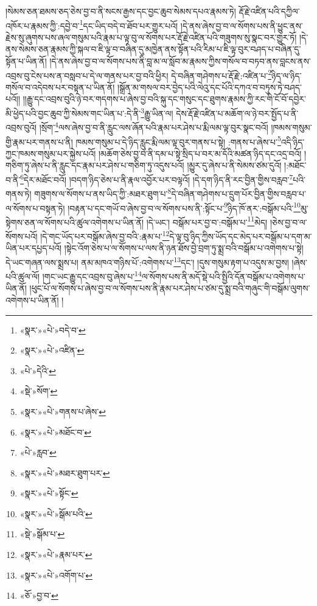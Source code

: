 །སེམས་ཅན་ཐམས་ཅད་ཅེས་བྱ་བ་ནི་སངས་རྒྱས་དང་བྱང་ཆུབ་སེམས་དཔའ་རྣམས་ཏེ། རྡོ་རྗེ་འཛིན་པའི་དཀྱིལ་འཁོར་པ་རྣམས་ཀྱི་:དབྱེ་བ་\footnote{«སྣར་»«པེ་»བདེ་བ་}དང་ཡིད་བདེ་བ་ཐོབ་པར་གྱུར་པའོ། །དེ་ནས་ཞེས་བྱ་བ་ལ་སོགས་པས་ནི་ཕྱུང་ནས་རྗེས་སུ་ཞུགས་པས་ཞལ་གསུམ་པའི་རྣམ་པ་ལྟ་བུ་ལ་སོགས་པར་རྡོ་རྗེ་འཛིན་པའི་གཟུགས་སུ་སྣང་བར་གྱུར་ཏོ། །དེ་ནས་སེམས་ཅན་རྣམས་ཀྱི་སྐལ་བ་ཇི་ལྟ་བ་བཞིན་དུ་མཁྱེན་ནས་སྟོན་པའི་རིམ་པ་ཇི་ལྟ་བུར་བཤད་པ་བཞིན་དུ་སྟོན་པ་ཡིན་ནོ། །དེ་ནས་ཞེས་བྱ་བ་ལ་སོགས་པས་ནི་བླ་མ་ལ་སློབ་མ་རྣམས་ཀྱིས་གསོལ་བ་བཏབ་ནས་བླངས་ནས་འབྲས་བུ་ངེས་པས་ན་བསླབ་པ་དེ་ལ་གནས་པར་བྱ་བའི་ཕྱིར། དེ་བཞིན་གཤེགས་པ་རྡོ་རྗེ་:འཛིན་པ་\footnote{«སྣར་»«པེ་»འཛིན་}ཉིད་ལ་ཉིད་གསོལ་བ་འདེབས་པར་བསྟན་པ་ཡིན་ནོ། །སྒྲོན་མ་གསལ་བར་བྱེད་པའི་ལེའུ་དང་པོའི་དཀའ་བ་བཏུས་ཏེ་བཤད་པའོ།། །།རྒྱུ་དང་འབྲས་བུའི་ཉེ་བར་གདགས་པ་ཞེས་བྱ་བའི་སྐུ་དང་གསུང་དང་ཐུགས་རྣམས་ཀྱི་རང་གི་ངོ་བོ་དབྱེར་མི་ཕྱེད་པའི་བྱང་ཆུབ་ཀྱི་སེམས་གང་ཡིན་པ་:དེ་ནི་\footnote{«པེ་»དེའི་}རྒྱུ་ཡིན་ལ། དེས་རྡོ་རྗེ་འཛིན་པ་མཆོག་ལ་ཉེ་བར་སྤྱོད་པ་ནི་འབྲས་བུའོ། །སྲོག་\footnote{«སྡེ་»སོག་}ལས་ཞེས་བྱ་བ་ནི་རླུང་ལས་ཞོན་པའི་རྣམ་པར་ཤེས་པ་རྨི་ལམ་ལྟ་བུར་སྣང་བའོ། །ཁམས་གསུམ་གྱི་རྣམ་པར་གནས་པ་ནི། ཁམས་གསུམ་པ་དེ་ཉིད་རླུང་རྨི་ལམ་ལྟ་བུར་གནས་པ་སྟེ། :གནས་པ་ཞེས་པ་\footnote{«སྣར་»«པེ་»གནས་པ་ཞེས་}འདི་ཉིད་ཀྱང་ཁམས་གསུམ་པར་སྐྱེས་པའོ། །མཆོག་ཅེས་བྱ་བ་ནི་དམ་པ་སྟེ་སྲིད་པ་བར་མ་དོའི་མཚན་ཉིད་དང་འདྲ་བའོ། །གཅིག་ཏུ་ཞེས་པ་ནི་རླུང་དང་རྣམ་པར་ཤེས་པ་གཅིག་ཏུ་འདུས་པའོ། །མྱུར་དུ་ཞེས་པ་ནི་སེམས་ཙམ་དུའོ། །:མཐོང་བ་ནི་\footnote{«སྣར་»«པེ་»མཐོང་བ་}དེར་མཐོང་བའོ། །བདག་ཉིད་ཅེས་པ་ནི་རྣལ་འབྱོར་པར་བལྟའོ། །དེ་དག་ཉིད་ནི་རང་བྱིན་གྱིས་བརླབ་\footnote{«པེ་»རླབ་}པའི་གནས་ཏེ། གཟུགས་ལ་སོགས་པ་ནས་ཡིད་ཀྱི་:མཐར་ཐུག་པ་\footnote{«སྣར་»«པེ་»མཐར་ཐུག་པར་}དེ་བཞིན་གཤེགས་པ་དྲུག་པོར་བྱིན་གྱིས་བརླབ་པ་ལ་སོགས་པ་བསྟན་ཏེ། །བརྟན་པ་དང་གཡོ་བ་ཞེས་བྱ་བ་ལ་སོགས་པས་ནི་:སྟོང་པ་\footnote{«སྣར་»«པེ་»སྟོང་}ཉིད་ཁོ་ནར་:བསྒོམ་པའི་\footnote{«སྣར་»«པེ་»སྒོམ་པའི་}མུ་སྟེགས་ཅན་ལ་སོགས་པའི་ཚུལ་འགེགས་པ་ཡིན་ནོ། །དེ་ཡང་། བསྒོམ་པར་བྱ་བ་:བསྒོམ་པ་\footnote{«སྡེ་»སྒོམ་པ་}མེད། །ཅེས་བྱ་བ་ལ་སོགས་པའོ། །དེ་གང་ཡོད་པར་བསྒོམ་ཞེས་བྱ་བའི་:རྣམ་པ་\footnote{«སྣར་»«པེ་»རྣམ་པར་}དེ་ལྟ་བུ་ཉིད་ཀྱིས་ཡོད་དང་མེད་པར་བསྒོམ་པ་དག་མ་ཡིན་པར་དཔྱད་པའོ། །སྟེང་འོག་ཅེས་པ་ལ་སོགས་པ་ལས་ནི་ཉན་ཐོས་བྱེ་བྲག་ཏུ་སྨྲ་བའི་བསྒོམ་པ་འགེགས་པ་སྟེ། དེ་ཡང་གཞན་ལས་སྨྲས་པ། ནམ་མཁའ་གཉིས་པོ་:འགེགས་པ་\footnote{«སྣར་»«པེ་»འགོག་པ་}དང་། །དུས་གསུམ་རྟག་པ་འདུས་མ་བྱས། །ཞེས་པའི་ཚུལ་ལོ། །གང་ཡང་རྒྱུ་དང་འབྲས་བུ་ཞེས་པ་\footnote{«ཅོ་»བྱ་བ་}ལ་སོགས་པས་ནི་མདོ་སྡེ་པའི་སྤྱིའི་དོན་བསྒོམ་པ་འགེགས་པ་ཡིན་ནོ། །ཕུང་པོ་ལ་སོགས་པ་ཞེས་བྱ་བ་ལ་སོགས་པས་ནི་རྣམ་པར་ཤེས་པ་ཙམ་དུ་སྨྲ་བའི་གཞུང་གི་བསྒོམ་ལུགས་འགེགས་པ་ཡིན་ནོ། །
